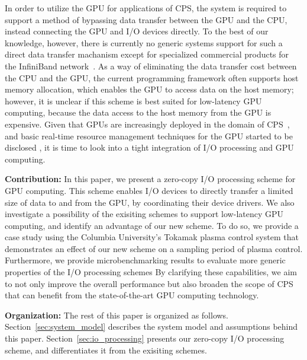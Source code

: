 In order to utilize the GPU for applications of CPS, the system is
required to support a method of bypassing data transfer between the GPU
and the CPU, instead connecting the GPU and I/O devices directly.
To the best of our knowledge, however, there is currently no generic
systems support for such a direct data transfer machanism except for
specialized commercial products for the InfiniBand
network~\cite{GPUDirect}.
As a way of eliminating the data transfer cost between the CPU and the
GPU, the current programming framework often supports host memory
allocation, which enables the GPU to access data on the host memory;
however, it is unclear if this scheme is best suited for low-latency GPU
computing, because the data access to the host memory from the GPU is
expensive.
Given that GPUs are increasingly deployed in the domain of
CPS~\cite{Hirabayashi_REACTION12, Mangharam11, McNaughton_ICRA11,
Michel_IROS07}, 
and basic real-time resource management techniques for the GPU started to be
disclosed \cite{Elliott_RTS12, Elliott_ECRTS12, Kato_RTAS11,
Kato_RTSS11, Kato_ATC11, Kato_ATC12, Liu_PACT12}, it is time to look
into a tight integration of I/O processing and GPU computing.

\textbf{Contribution:}
In this paper, we present a zero-copy I/O processing scheme for GPU
computing.
This scheme enables I/O devices to directly transfer a limited size of
data to and from the GPU, by coordinating their device drivers. 
We also investigate a possibility of the exisiting schemes to support
low-latency GPU computing, and identify an advantage of our new scheme.
To do so, we provide a case study using the Columbia University's
Tokamak plasma control system that demonstrates an effect of our
new scheme on a sampling period of plasma control.
Furthermore, we provide microbenchmarking results to evaluate more
generic properties of the I/O processing schemes
By clarifying these capabilities, we aim to not only improve the overall
performance but also broaden the scope of CPS that can benefit from the
state-of-the-art GPU computing technology.

\textbf{Organization:}
The rest of this paper is organized as follows.
Section~\ref{sec:system_model} describes the system model and
assumptions behind this paper.
Section~\ref{sec:io_processing} presents our zero-copy I/O processing
scheme, and differentiates it from the exisiting schemes.